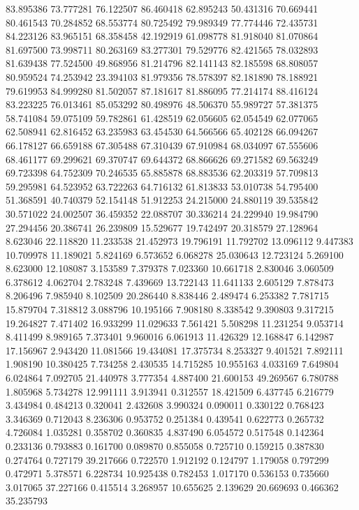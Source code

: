 83.895386
73.777281
76.122507
86.460418
62.895243
50.431316
70.669441
80.461543
70.284852
68.553774
80.725492
79.989349
77.774446
72.435731
84.223126
83.965151
68.358458
42.192919
61.098778
81.918040
81.070864
81.697500
73.998711
80.263169
83.277301
79.529776
82.421565
78.032893
81.639438
77.524500
49.868956
81.214796
82.141143
82.185598
68.808057
80.959524
74.253942
23.394103
81.979356
78.578397
82.181890
78.188921
79.619953
84.999280
81.502057
87.181617
81.886095
77.214174
88.416124
83.223225
76.013461
85.053292
80.498976
48.506370
55.989727
57.381375
58.741084
59.075109
59.782861
61.428519
62.056605
62.054549
62.077065
62.508941
62.816452
63.235983
63.454530
64.566566
65.402128
66.094267
66.178127
66.659188
67.305488
67.310439
67.910984
68.034097
67.555606
68.461177
69.299621
69.370747
69.644372
68.866626
69.271582
69.563249
69.723398
64.752309
70.246535
65.885878
68.883536
62.203319
57.709813
59.295981
64.523952
63.722263
64.716132
61.813833
53.010738
54.795400
51.368591
40.740379
52.154148
51.912253
24.215000
24.880119
39.535842
30.571022
24.002507
36.459352
22.088707
30.336214
24.229940
19.984790
27.294456
20.386741
26.239809
15.529677
19.742497
20.318579
27.128964
8.623046
22.118820
11.233538
21.452973
19.796191
11.792702
13.096112
9.447383
10.709978
11.189021
5.824169
6.573652
6.068278
25.030643
12.723124
5.269100
8.623000
12.108087
3.153589
7.379378
7.023360
10.661718
2.830046
3.060509
6.378612
4.062704
2.783248
7.439669
13.722143
11.641133
2.605129
7.878473
8.206496
7.985940
8.102509
20.286440
8.838446
2.489474
6.253382
7.781715
15.879704
7.318812
3.088796
10.195166
7.908180
8.338542
9.390803
9.317215
19.264827
7.471402
16.933299
11.029633
7.561421
5.508298
11.231254
9.053714
8.411499
8.989165
7.373401
9.960016
6.061913
11.426329
12.168847
6.142987
17.156967
2.943420
11.081566
19.434081
17.375734
8.253327
9.401521
7.892111
1.908190
10.380425
7.734258
2.430535
14.715285
10.955163
4.033169
7.649804
6.024864
7.092705
21.440978
3.777354
4.887400
21.600153
49.269567
6.780788
1.805968
5.734278
12.991111
3.913941
0.312557
18.421509
6.437745
6.216779
3.434984
0.484213
0.320041
2.432608
3.990324
0.090011
0.330122
0.768423
3.346369
0.712043
8.236306
0.953752
0.251384
0.439541
0.622773
0.265732
4.726084
1.035281
0.358702
0.360835
4.837490
6.054572
0.517548
0.142364
0.233136
0.793883
0.161700
0.089870
0.855058
0.725710
0.159215
0.387830
0.274764
0.727179
39.217666
0.722570
1.912192
0.124797
1.179058
0.797299
0.472971
5.378571
6.228734
10.925438
0.782453
1.017170
0.536153
0.735660
3.017065
37.227166
0.415514
3.268957
10.655625
2.139629
20.669693
0.466362
35.235793
